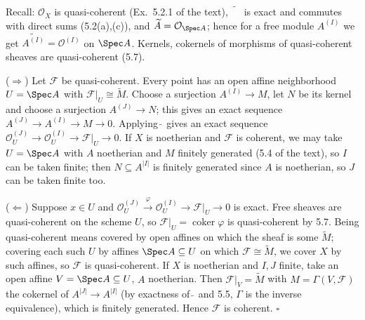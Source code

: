 \documentclass[11pt]{article}
\begin{document}
\pf
Recall: $\mathcal O_X$ is quasi-coherent (Ex.\ 5.2.1 of the text), $\widetilde{\phantom{M}}$ is exact and commutes with direct sums (5.2(a),(c)), and $\widetilde A=\mathcal O_{\Spec A}$; hence for a free module $A^{(I)}$ we get $\widetilde{A^{(I)}}=\mathcal O^{(I)}$ on $\Spec A$. Kernels, cokernels of morphisms of quasi-coherent sheaves are quasi-coherent (5.7).

($\Rightarrow$) Let $\mathcal F$ be quasi-coherent. Every point has an open affine neighborhood $U=\Spec A$ with $\mathcal F|_U\cong\widetilde M$. Choose a surjection $A^{(I)}\to M$, let $N$ be its kernel and choose a surjection $A^{(J)}\to N$; this gives an exact sequence $A^{(J)}\to A^{(I)}\to M\to0$. Applying $\widetilde{\ }$ gives an exact sequence $\mathcal O_U^{(J)}\to\mathcal O_U^{(I)}\to\mathcal F|_U\to0$. If $X$ is noetherian and $\mathcal F$ is coherent, we may take $U=\Spec A$ with $A$ noetherian and $M$ finitely generated (5.4 of the text), so $I$ can be taken finite; then $N\subseteq A^{|I|}$ is finitely generated since $A$ is noetherian, so $J$ can be taken finite too.

($\Leftarrow$) Suppose $x\in U$ and $\mathcal O_U^{(J)}\xrightarrow{\ \varphi\ }\mathcal O_U^{(I)}\to\mathcal F|_U\to0$ is exact. Free sheaves are quasi-coherent on the scheme $U$, so $\mathcal F|_U=\operatorname{coker}\varphi$ is quasi-coherent by 5.7. Being quasi-coherent means covered by open affines on which the sheaf is some $\widetilde M$; covering each such $U$ by affines $\Spec A\subseteq U$ on which $\mathcal F\cong\widetilde M$, we cover $X$ by such affines, so $\mathcal F$ is quasi-coherent. If $X$ is noetherian and $I,J$ finite, take an open affine $V=\Spec A\subseteq U$, $A$ noetherian. Then $\mathcal F|_V=\widetilde M$ with $M=\Gamma(V,\mathcal F)$ the cokernel of $A^{|J|}\to A^{|I|}$ (by exactness of $\widetilde{\ }$ and 5.5, $\Gamma$ is the inverse equivalence), which is finitely generated. Hence $\mathcal F$ is coherent. \hfill$\square$
\end{document}
